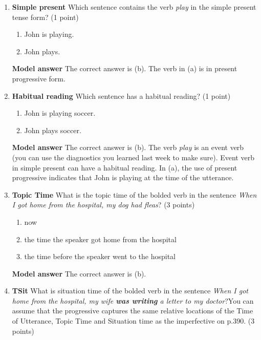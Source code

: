 \documentclass[a4,11pt]{article}
\newcommand{\6}{\mbox{$[\hspace*{-.6mm}[$}}
\newcommand{\9}{\mbox{$]\hspace*{-.6mm}]$}}
\begin{document}
\begin{enumerate}[leftmargin = 12pt]
{\bf Model answer} The correct answers as past tense (a), present tense (b) and future tense (c).


\item {\bf Simple present} Which sentence contains the verb {\em play} in the simple present tense form? (1 point)

\begin{enumerate}[noitemsep]
\item John is playing.
\item John plays.
\end{enumerate}

{\bf Model answer} The correct answer is (b). The verb in (a) is in present progressive form.


\item {\bf Habitual reading} Which sentence has a habitual reading? (1 point)
\begin{enumerate}[noitemsep]
\item John is playing soccer.
\item John plays soccer.
\end{enumerate}

{\bf Model answer} The correct answer is (b). The verb \textit{play} is an event verb (you can use the diagnostics you learned last week to make sure). Event verb in simple present can have a habitual reading. In (a), the use of present progressive indicates that John is playing at the time of the utterance. 


\item {\bf Topic Time} What is the topic time of the bolded verb in the sentence \textit{When I got home from the hospital, my dog had fleas}? (3 points)

\begin{enumerate}[noitemsep]
\item  now
\item the time the speaker got home from the hospital
\item the time before the speaker went to the hospital
\end{enumerate}

{\bf Model answer} The correct answer is (b). 



\item {\bf TSit} What is situation time of the bolded verb in the sentence \textit{When I got home from the hospital, my wife {\bf was writing} a letter to my doctor}?You can assume that the progressive captures the same relative locations of the Time of Utterance, Topic Time and Situation time as the imperfective on p.390. (3 points)


\end{enumerate}
\end{document}
